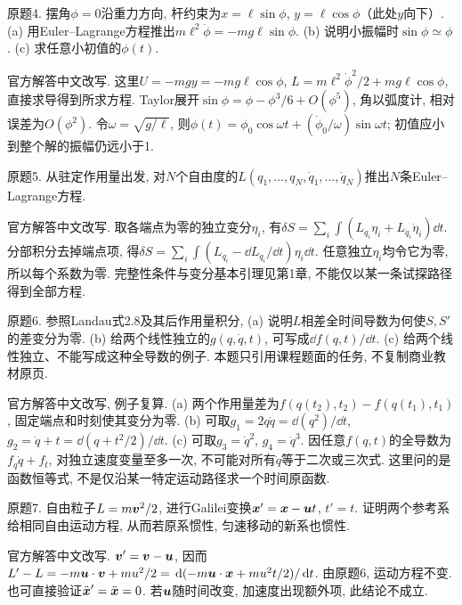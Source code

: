 \begin{exercise}
原题4. 摆角$\phi=0$沿重力方向, 杆约束为$x=\ell\sin\phi$, $y=\ell\cos\phi$（此处$y$向下）. (a) 用Euler--Lagrange方程推出$m\ell^2\ddot\phi=-mg\ell\sin\phi$. (b) 说明小振幅时$\sin\phi\simeq\phi$. (c) 求任意小初值的$\phi(t)$.
\end{exercise}
\begin{solution}
官方解答中文改写. 这里$U=-mgy=-mg\ell\cos\phi$, $L=m\ell^2\dot\phi^2/2+mg\ell\cos\phi$, 直接求导得到所求方程. Taylor展开$\sin\phi=\phi-\phi^3/6+O(\phi^5)$, 角以弧度计, 相对误差为$O(\phi^2)$. 令$\omega=\sqrt{g/\ell}$, 则$\phi(t)=\phi_0\cos\omega t+(\dot\phi_0/\omega)\sin\omega t$; 初值应小到整个解的振幅仍远小于1.
\end{solution}

\begin{exercise}
原题5. 从驻定作用量出发, 对$N$个自由度的$L(q_1,\ldots,q_N,\dot q_1,\ldots,\dot q_N)$推出$N$条Euler--Lagrange方程.
\end{exercise}
\begin{solution}
官方解答中文改写. 取各端点为零的独立变分$\eta_i$, 有$\delta S=\sum_i\int(L_{q_i}\eta_i+L_{\dot q_i}\dot\eta_i)\dd t$. 分部积分去掉端点项, 得$\delta S=\sum_i\int(L_{q_i}-\dd L_{\dot q_i}/\dd t)\eta_i\dd t$. 任意独立$\eta_i$均令它为零, 所以每个系数为零. 完整性条件与变分基本引理见第1章, 不能仅以某一条试探路径得到全部方程.
\end{solution}

\begin{exercise}
原题6. 参照Landau式2.8及其后作用量积分, (a) 说明$L$相差全时间导数为何使$S,S'$的差变分为零. (b) 给两个线性独立的$g(q,\dot q,t)$, 可写成$\dd f(q,t)/\dd t$. (c) 给两个线性独立、不能写成这种全导数的例子. 本题只引用课程题面的任务, 不复制商业教材原页.
\end{exercise}
\begin{solution}
官方解答中文改写, 例子复算. (a) 两个作用量差为$f(q(t_2),t_2)-f(q(t_1),t_1)$, 固定端点和时刻使其变分为零. (b) 可取$g_1=2q\dot q=\dd(q^2)/\dd t$, $g_2=\dot q+t=\dd(q+t^2/2)/\dd t$. (c) 可取$g_3=\dot q^2$, $g_4=\dot q^3$. 因任意$f(q,t)$的全导数为$f_q\dot q+f_t$, 对独立速度变量至多一次, 不可能对所有$\dot q$等于二次或三次式. 这里问的是函数恒等式, 不是仅沿某一特定运动路径求一个时间原函数.
\end{solution}

\begin{exercise}
原题7. 自由粒子$L=m\boldsymbol{v}^2/2$, 进行Galilei变换$\boldsymbol{x}'=\boldsymbol{x}-\boldsymbol{u} t$, $t'=t$. 证明两个参考系给相同自由运动方程, 从而若原系惯性, 匀速移动的新系也惯性.
\end{exercise}
\begin{solution}
官方解答中文改写. $\boldsymbol{v}'=\boldsymbol{v}-\boldsymbol{u}$, 因而$L'-L=-m\boldsymbol{u}\cdot\boldsymbol{v}+m u^2/2=\,\mathrm d(-m\boldsymbol{u}\cdot\boldsymbol{x}+m u^2t/2)/\,\mathrm d t$. 由原题6, 运动方程不变. 也可直接验证$\ddot{\boldsymbol{x}}'=\ddot{\boldsymbol{x}}=0$. 若$\boldsymbol{u}$随时间改变, 加速度出现额外项, 此结论不成立.
\end{solution}

